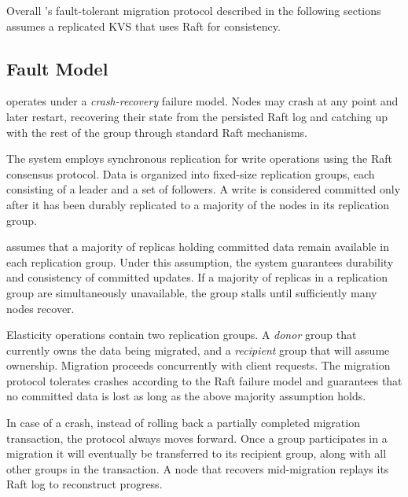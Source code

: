 Overall \OurImplementation{}'s fault-tolerant migration protocol described in the following sections assumes a replicated KVS that uses Raft for consistency.


\subsection{Fault Model}
\label{sec:fault-model}
\OurImplementation{} operates under a \emph{crash-recovery} failure model.
Nodes may crash at any point and later restart, recovering their state from the persisted Raft log and catching up with the rest of the group through standard Raft mechanisms.

The system employs synchronous replication for write operations using the Raft consensus protocol.
Data is organized into fixed-size replication groups, each consisting of a leader and a set of followers.
A write is considered committed only after it has been durably replicated to a majority of the nodes in its replication group.

\OurImplementation{} assumes that a majority of replicas holding committed data remain available in each replication group.
Under this assumption, the system guarantees durability and consistency of committed updates.
If a majority of replicas in a replication group are simultaneously unavailable, the group stalls until sufficiently many nodes recover.

Elasticity operations contain two replication groups. A \emph{donor} group that currently owns the data being migrated, and a \emph{recipient} group that will assume ownership.
Migration proceeds concurrently with client requests.
The migration protocol tolerates crashes according to the Raft failure model and guarantees that no committed data is lost as long as the above majority assumption holds.

In case of a crash, instead of rolling back a partially completed migration transaction, the protocol always moves forward. Once a group participates in a migration it will eventually be transferred to its recipient group, along with all other groups in the transaction.
A node that recovers mid-migration replays its Raft log to reconstruct progress. 


\iffalse
